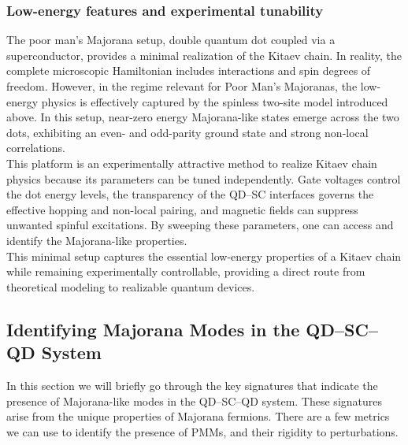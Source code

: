 \documentclass[11pt, letterpaper, titlepage]{article}
\begin{document}
\subsubsection{Low-energy features and experimental tunability}
The poor man's Majorana setup, double quantum dot coupled via a superconductor, provides a minimal realization of the Kitaev chain. In reality, the complete microscopic Hamiltonian includes interactions and spin degrees of freedom. However, in the regime relevant for Poor Man's Majoranas, the low-energy physics is effectively captured by the spinless two-site model introduced above. In this setup, near-zero energy Majorana-like states emerge across the two dots, exhibiting an even- and odd-parity ground state and strong non-local correlations.\\
This platform is an experimentally attractive method to realize Kitaev chain physics because its parameters can be tuned independently. Gate voltages control the dot energy levels, the transparency of the QD–SC interfaces governs the effective hopping and non-local pairing, and magnetic fields can suppress unwanted spinful excitations. By sweeping these parameters, one can access and identify the  Majorana-like properties. \\
This minimal setup captures the essential low-energy properties of a Kitaev chain while remaining experimentally controllable, providing a direct route from theoretical modeling to realizable quantum devices.
\subsection{Identifying Majorana Modes in the QD–SC–QD System}
In this section we will briefly go through the key signatures that indicate the presence of Majorana-like modes in the QD–SC–QD system. These signatures arise from the unique properties of Majorana fermions. There are a few metrics we can use to identify the presence of PMMs, and their rigidity to perturbations.\\
\end{document}
